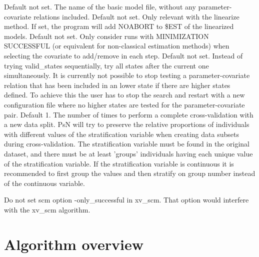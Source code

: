 \begin{optionlist}
\nextopt
{}
Default not set. The name of the basic model file, without any parameter-covariate
relations included.
\nextopt
{} 
Default not set. Only relevant with the linearize method. If set,
the program will add NOABORT to \$EST of the linearized models.
\nextopt
{} 
Default not set. Only consider runs with MINIMIZATION SUCCESSFUL 
(or equivalent for non-classical estimation methods) when 
selecting the covariate to add/remove in each step.
\nextopt
{} 
Default not set. Instead of trying valid\_states sequentially, try all states after the 
current one simultaneously. It is currently not possible to stop testing a parameter-covariate 
relation that has been included in an lower state if there are higher states defined. 
To achieve this the user has to stop the search and restart with a new configuration file where 
no higher states are tested for the parameter-covariate pair. 
\nextopt
{} 
Default 1. The number of times to perform a complete cross-validation
with a new data split. 
\nextopt
{} 
PsN will try to preserve the relative proportions of individuals
with different values of the stratification variable
when creating data subsets during cross-validation.
The stratification variable must be found in the original dataset,
and there must be at least 'groups' individuals having each
unique value of the stratification variable. If the stratification
variable is continuous it is recommended to first group the values
and then stratify on group number instead of the continuous variable.
\nextopt
\end{optionlist}

Do not set scm option -only\_successful in xv\_scm. That option would interfere with the xv\_scm algorithm.


\section{Algorithm overview}

